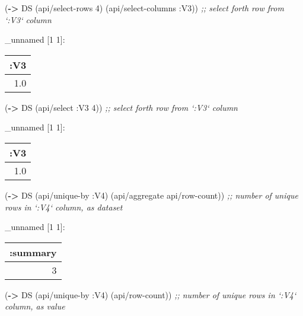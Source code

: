 \documentclass[]{article}
\newenvironment{Shaded}{\begin{snugshade}}{\end{snugshade}}
\newcommand{\KeywordTok}[1]{\textcolor[rgb]{0.13,0.29,0.53}{\textbf{#1}}}
\newcommand{\DecValTok}[1]{\textcolor[rgb]{0.00,0.00,0.81}{#1}}
\newcommand{\CommentTok}[1]{\textcolor[rgb]{0.56,0.35,0.01}{\textit{#1}}}
\newcommand{\AttributeTok}[1]{\textcolor[rgb]{0.77,0.63,0.00}{#1}}
\newcommand{\NormalTok}[1]{#1}
\begin{document}
\begin{Shaded}
\begin{Highlighting}[]
\NormalTok{(}\KeywordTok{->}\NormalTok{ DS}
\NormalTok{    (api/select-rows }\DecValTok{4}\NormalTok{)}
\NormalTok{    (api/select-columns }\AttributeTok{:V3}\NormalTok{)) }\CommentTok{;; select forth row from `:V3` column}
\end{Highlighting}
\end{Shaded}

\_unnamed {[}1 1{]}:

\begin{longtable}[]{@{}r@{}}
\toprule
:V3\tabularnewline
\midrule
\endhead
1.0\tabularnewline
\bottomrule
\end{longtable}

\begin{Shaded}
\begin{Highlighting}[]
\NormalTok{(}\KeywordTok{->}\NormalTok{ DS}
\NormalTok{    (api/select }\AttributeTok{:V3} \DecValTok{4}\NormalTok{)) }\CommentTok{;; select forth row from `:V3` column}
\end{Highlighting}
\end{Shaded}

\_unnamed {[}1 1{]}:

\begin{longtable}[]{@{}r@{}}
\toprule
:V3\tabularnewline
\midrule
\endhead
1.0\tabularnewline
\bottomrule
\end{longtable}

\begin{Shaded}
\begin{Highlighting}[]
\NormalTok{(}\KeywordTok{->}\NormalTok{ DS}
\NormalTok{    (api/unique-by }\AttributeTok{:V4}\NormalTok{)}
\NormalTok{    (api/aggregate api/row-count)) }\CommentTok{;; number of unique rows in `:V4` column, as dataset}
\end{Highlighting}
\end{Shaded}

\_unnamed {[}1 1{]}:

\begin{longtable}[]{@{}r@{}}
\toprule
:summary\tabularnewline
\midrule
\endhead
3\tabularnewline
\bottomrule
\end{longtable}

\begin{Shaded}
\begin{Highlighting}[]
\NormalTok{(}\KeywordTok{->}\NormalTok{ DS}
\NormalTok{    (api/unique-by }\AttributeTok{:V4}\NormalTok{)}
\NormalTok{    (api/row-count)) }\CommentTok{;; number of unique rows in `:V4` column, as value}
\end{Highlighting}
\end{Shaded}
\end{document}
